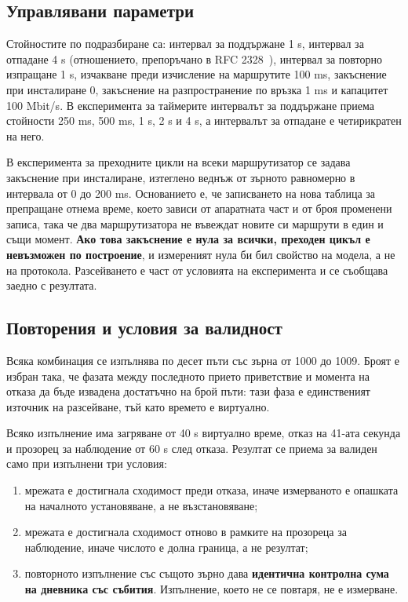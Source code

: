 \subsection{Управлявани параметри}

Стойностите по подразбиране са: интервал за поддържане 1 s, интервал за отпадане 4 s
(отношението, препоръчано в RFC 2328~\cite{rfc2328}), интервал за повторно изпращане 1 s,
изчакване преди изчисление на маршрутите 100 ms, закъснение при инсталиране 0, закъснение
на разпространение по връзка 1 ms и капацитет 100 Mbit/s. В експеримента за таймерите
интервалът за поддържане приема стойности 250 ms, 500 ms, 1 s, 2 s и 4 s, а интервалът за
отпадане е четирикратен на него.

В експеримента за преходните цикли на всеки маршрутизатор се задава закъснение при
инсталиране, изтеглено веднъж от зърното равномерно в интервала от 0 до 200 ms. Основанието
е, че записването на нова таблица за препращане отнема време, което зависи от апаратната
част и от броя променени записа, така че два маршрутизатора не въвеждат новите си маршрути
в един и същи момент. \textbf{Ако това закъснение е нула за всички, преходен цикъл е
невъзможен по построение}, и измереният нула би бил свойство на модела, а не на протокола.
Разсейването е част от условията на експеримента и се съобщава заедно с резултата.

\subsection{Повторения и условия за валидност}

Всяка комбинация се изпълнява по десет пъти със зърна от 1000 до 1009. Броят е избран така,
че фазата между последното прието приветствие и момента на отказа да бъде извадена
достатъчно на брой пъти: тази фаза е единственият източник на разсейване, тъй като времето
е виртуално.

Всяко изпълнение има загряване от 40 s виртуално време, отказ на 41-ата секунда и прозорец
за наблюдение от 60 s след отказа. Резултат се приема за валиден само при изпълнени три
условия:

\begin{enumerate}[topsep=0pt,itemsep=0pt,leftmargin=*]
\item мрежата е достигнала сходимост преди отказа, иначе измерваното е опашката на
      началното установяване, а не възстановяване;
\item мрежата е достигнала сходимост отново в рамките на прозореца за наблюдение, иначе
      числото е долна граница, а не резултат;
\item повторното изпълнение със същото зърно дава \textbf{идентична контролна сума на
      дневника със събития}. Изпълнение, което не се повтаря, не е измерване.
\end{enumerate}

